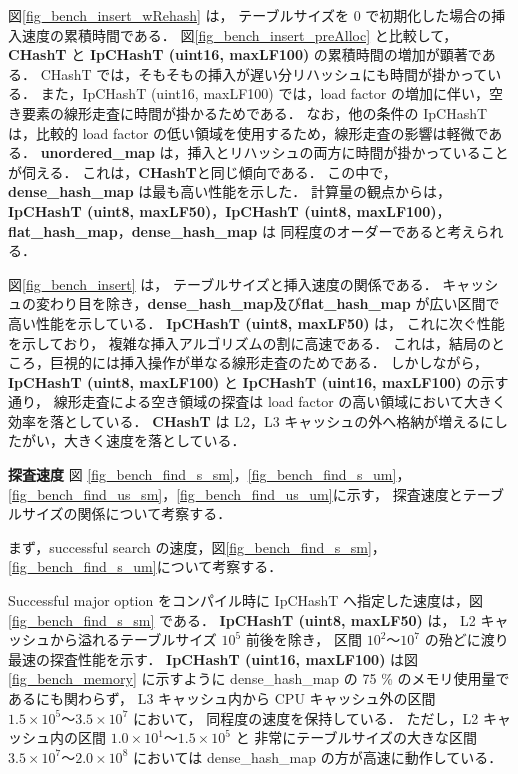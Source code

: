 図\ref{fig_bench_insert_wRehash} は，
テーブルサイズを 0 で初期化した場合の挿入速度の累積時間である．
図\ref{fig_bench_insert_preAlloc} と比較して，
{\bf CHashT} と {\bf IpCHashT (uint16, maxLF100)} の累積時間の増加が顕著である．
CHashT では，そもそもの挿入が遅い分リハッシュにも時間が掛かっている．
また，IpCHashT (uint16, maxLF100) では，load factor の増加に伴い，空き要素の線形走査に時間が掛かるためである．
なお，他の条件の IpCHashT は，比較的 load factor の低い領域を使用するため，線形走査の影響は軽微である．
{\bf unordered\_map} は，挿入とリハッシュの両方に時間が掛かっていることが伺える．
これは，{\bf CHashT}と同じ傾向である．
この中で，{\bf dense\_hash\_map} は最も高い性能を示した．
計算量の観点からは，
{\bf IpCHashT (uint8, maxLF50)}，{\bf IpCHashT (uint8, maxLF100)}，{\bf flat\_hash\_map}，{\bf dense\_hash\_map} は
同程度のオーダーであると考えられる．

図\ref{fig_bench_insert} は，
テーブルサイズと挿入速度の関係である．
キャッシュの変わり目を除き，{\bf dense\_hash\_map}及び{\bf flat\_hash\_map} が広い区間で高い性能を示している．
{\bf IpCHashT (uint8, maxLF50)} は，
これに次ぐ性能を示しており，
複雑な挿入アルゴリズムの割に高速である．
これは，結局のところ，巨視的には挿入操作が単なる線形走査のためである．
しかしながら，{\bf IpCHashT (uint8, maxLF100)} と {\bf IpCHashT (uint16, maxLF100)} の示す通り，
線形走査による空き領域の探査は load factor の高い領域において大きく効率を落としている．
{\bf CHashT} は L2，L3 キャッシュの外へ格納が増えるにしたがい，大きく速度を落としている．
\leavevmode \newline

%
{\bf 探査速度}
\samepage\newline\indent
図
\ref{fig_bench_find_s_sm}，\ref{fig_bench_find_s_um}，
\ref{fig_bench_find_us_sm}，\ref{fig_bench_find_us_um}に示す，
探査速度とテーブルサイズの関係について考察する．

まず，successful search の速度，図\ref{fig_bench_find_s_sm}，\ref{fig_bench_find_s_um}について考察する．

Successful major option をコンパイル時に IpCHashT へ指定した速度は，図\ref{fig_bench_find_s_sm} である．
{\bf IpCHashT (uint8, maxLF50)} は，
L2 キャッシュから溢れるテーブルサイズ $10^5$ 前後を除き，
区間 $10^2〜10^7$ の殆どに渡り最速の探査性能を示す．
{\bf IpCHashT (uint16, maxLF100)} は図\ref{fig_bench_memory} に示すように
dense\_hash\_map の 75 \% のメモリ使用量であるにも関わらず，
L3 キャッシュ内から CPU キャッシュ外の区間 $1.5\times10^5〜3.5\times10^7$ において，
同程度の速度を保持している．
ただし，L2 キャッシュ内の区間 $1.0\times10^1〜1.5\times10^5$ と
非常にテーブルサイズの大きな区間 $3.5\times10^7〜2.0\times10^8$ においては
dense\_hash\_map の方が高速に動作している．


